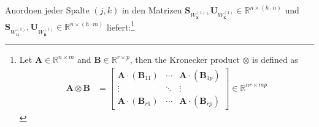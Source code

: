 \documentclass[a4paper, 12pt]{scrartcl}
\begin{document}
Anordnen jeder Spalte $(j,k)$ in den Matrizen 
$\bm{S}_{W_{\bm{x}}^{(1)}},\bm{U}_{W_{\bm{x}}^{(1)}} \in \mathbb{R}^{n \times (h \cdot n)}$ 
und $\bm{S}_{W_{\bm{u}}^{(1)}},\bm{U}_{W_{\bm{u}}^{(1)}} \in \mathbb{R}^{n \times (h \cdot m)}$ 
liefert:\footnote{
    Let $\bm{A} \in \mathbb{R}^{n \times m}$ and $\bm{B} \in \mathbb{R}^{r \times p}$, 
    then the Kronecker product $\otimes$ is defined as
    \begin{align*}
        \bm{A} \otimes \bm{B} 
        &=
        \begin{bmatrix}
            \bm{A} \cdot (\bm{B}_{11})      & \cdots & \bm{A} \cdot (\bm{B}_{1p}) \\
            \vdots                          & \ddots & \vdots \\
            \bm{A} \cdot (\bm{B}_{r1})      & \cdots & \bm{A} \cdot (\bm{B}_{rp})
        \end{bmatrix}
        \in \mathbb{R}^{nr \times mp}
    \end{align*}
}
\end{document}

